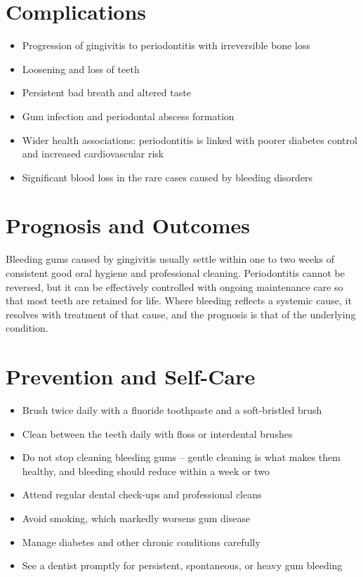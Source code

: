 \section*{Complications}
\begin{itemize}
    \item Progression of gingivitis to periodontitis with irreversible bone loss
    \item Loosening and loss of teeth
    \item Persistent bad breath and altered taste
    \item Gum infection and periodontal abscess formation
    \item Wider health associations: periodontitis is linked with poorer diabetes control and increased cardiovascular risk
    \item Significant blood loss in the rare cases caused by bleeding disorders
\end{itemize}

\section*{Prognosis and Outcomes}
Bleeding gums caused by gingivitis usually settle within one to two weeks of consistent good oral hygiene and professional cleaning. Periodontitis cannot be reversed, but it can be effectively controlled with ongoing maintenance care so that most teeth are retained for life. Where bleeding reflects a systemic cause, it resolves with treatment of that cause, and the prognosis is that of the underlying condition.

\section*{Prevention and Self-Care}
\begin{itemize}
    \item Brush twice daily with a fluoride toothpaste and a soft-bristled brush
    \item Clean between the teeth daily with floss or interdental brushes
    \item Do not stop cleaning bleeding gums -- gentle cleaning is what makes them healthy, and bleeding should reduce within a week or two
    \item Attend regular dental check-ups and professional cleans
    \item Avoid smoking, which markedly worsens gum disease
    \item Manage diabetes and other chronic conditions carefully
    \item See a dentist promptly for persistent, spontaneous, or heavy gum bleeding
\end{itemize}


